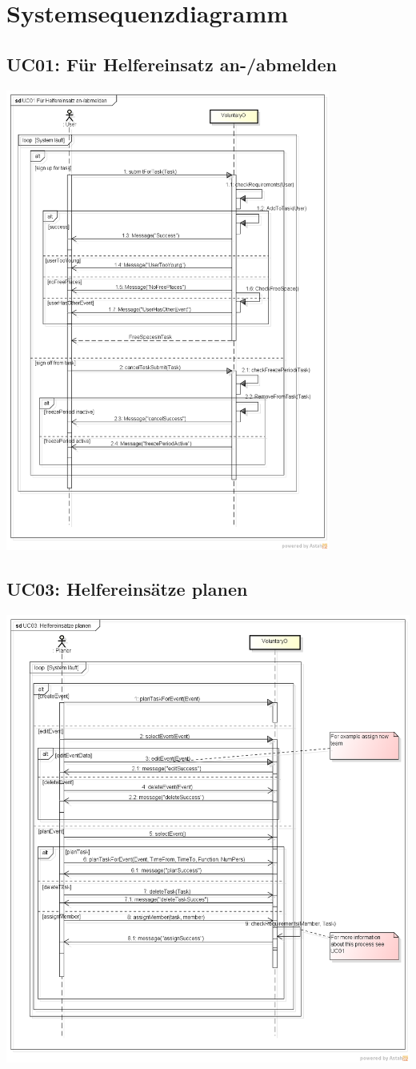 \chapter{Systemsequenzdiagramm}
 \section{UC01: Für Helfereinsatz an-/abmelden}
 	\includegraphics[width=0.8\textwidth]{content/domainanalyse/images/UC01_Fuer_Helfereinsatz_an_abmelden.png}


 \section{UC03: Helfereinsätze planen}
 	\includegraphics[width=\textwidth]{content/domainanalyse/images/UC03_Helfereinsaetze_planen.png}
